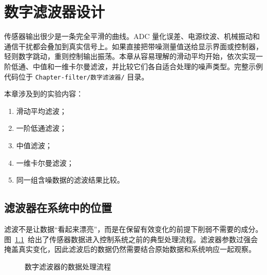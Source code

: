 \chapter{数字滤波器设计} \label{ch:digital-filter}

传感器输出很少是一条完全平滑的曲线。ADC 量化误差、电源纹波、机械振动和通信干扰都会叠加到真实信号上。如果直接把带噪测量值送给显示界面或控制器，轻则数字跳动，重则控制输出振荡。本章从容易理解的滑动平均开始，依次实现一阶低通、中值和一维卡尔曼滤波，并比较它们各自适合处理的噪声类型。完整示例代码位于 \texttt{Chapter-filter/数字滤波器/} 目录。

\medskip 本章涉及到的实验内容：
\begin{enumerate}
\item 滑动平均滤波；
\item 一阶低通滤波；
\item 中值滤波；
\item 一维卡尔曼滤波；
\item 同一组含噪数据的滤波结果比较。
\end{enumerate}

\section{滤波器在系统中的位置}

滤波不是让数据“看起来漂亮”，而是在保留有效变化的前提下削弱不需要的成分。图~\ref{fig:filter-data-flow}~给出了传感器数据进入控制系统之前的典型处理流程。滤波器参数过强会掩盖真实变化，因此滤波后的数据仍然需要结合原始数据和系统响应一起观察。

\begin{figure}[htbp]
\centering
{}
\caption{数字滤波器的数据处理流程} \label{fig:filter-data-flow}
\end{figure}

